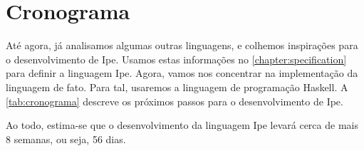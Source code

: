 
\chapter{Cronograma}

Até agora, já analisamos algumas outras linguagens, e colhemos inspirações para
o desenvolvimento de Ipe. Usamos estas informações no \autoref{chapter:specification}
para definir a linguagem Ipe. Agora, vamos nos concentrar na implementação da
linguagem de fato. Para tal, usaremos a linguagem de programação Haskell.  A
\autoref{tab:cronograma} descreve os próximos passos para o desenvolvimento de Ipe.

\begin{table}[htb]
    \caption{Cronograma de desenvolvimento para a linguagem Ipe}
    \label{tab:cronograma}
\end{table}

Ao todo, estima-se que o desenvolvimento da linguagem Ipe levará cerca de mais 8
semanas, ou seja, 56 dias.
